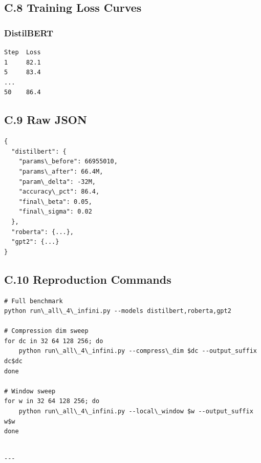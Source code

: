 \subsection{C.8 Training Loss Curves}

\subsubsection{DistilBERT}
\begin{lstlisting}
Step  Loss
1     82.1
5     83.4
...
50    86.4
\end{lstlisting}

\subsection{C.9 Raw JSON}

\begin{lstlisting}
{
  "distilbert": {
    "params\_before": 66955010,
    "params\_after": 66.4M,
    "param\_delta": -32M,
    "accuracy\_pct": 86.4,
    "final\_beta": 0.05,
    "final\_sigma": 0.02
  },
  "roberta": {...},
  "gpt2": {...}
}
\end{lstlisting}

\subsection{C.10 Reproduction Commands}

\begin{lstlisting}
# Full benchmark
python run\_all\_4\_infini.py --models distilbert,roberta,gpt2

# Compression dim sweep
for dc in 32 64 128 256; do
    python run\_all\_4\_infini.py --compress\_dim $dc --output_suffix dc$dc
done

# Window sweep
for w in 32 64 128 256; do
    python run\_all\_4\_infini.py --local\_window $w --output_suffix w$w
done
\end{lstlisting}
\begin{lstlisting}

---
\end{lstlisting}